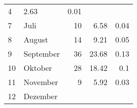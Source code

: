 \begin{longtable}{lXrrr}
       \num{4} &
       \num[round-mode=places,round-precision=2]{2.63} &
         \num[round-mode=places,round-precision=2]{0.01} \\

     7 &
     \multicolumn{1}{X}{ Juli   } &


       \num{10} &
       \num[round-mode=places,round-precision=2]{6.58} &
         \num[round-mode=places,round-precision=2]{0.04} \\

     8 &
     \multicolumn{1}{X}{ August   } &


       \num{14} &
       \num[round-mode=places,round-precision=2]{9.21} &
         \num[round-mode=places,round-precision=2]{0.05} \\

     9 &
     \multicolumn{1}{X}{ September   } &


       \num{36} &
       \num[round-mode=places,round-precision=2]{23.68} &
         \num[round-mode=places,round-precision=2]{0.13} \\

     10 &
     \multicolumn{1}{X}{ Oktober   } &


       \num{28} &
       \num[round-mode=places,round-precision=2]{18.42} &
         \num[round-mode=places,round-precision=2]{0.1} \\

     11 &
     \multicolumn{1}{X}{ November   } &


       \num{9} &
       \num[round-mode=places,round-precision=2]{5.92} &
         \num[round-mode=places,round-precision=2]{0.03} \\

     12 &
     \multicolumn{1}{X}{ Dezember   } &



\end{longtable}
